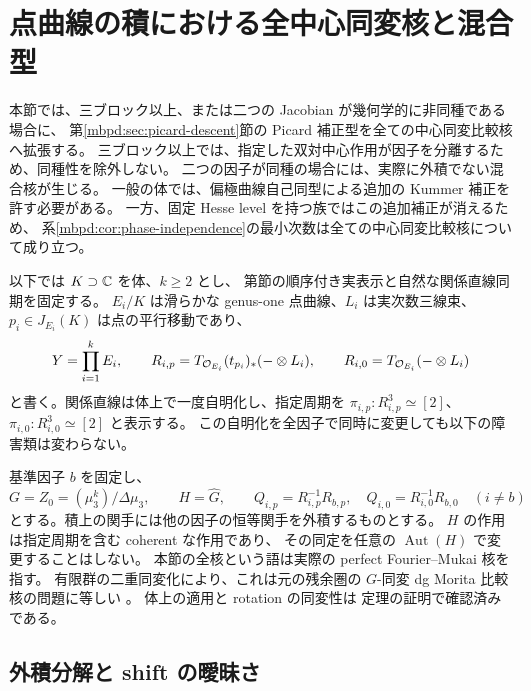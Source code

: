 \section{点曲線の積における全中心同変核と混合型}
\label{mbfc:sec:full-comparison}

本節では、三ブロック以上、または二つの Jacobian が幾何学的に非同種である場合に、
第\ref{mbpd:sec:picard-descent}節の Picard 補正型を全ての中心同変比較核へ拡張する。
三ブロック以上では、指定した双対中心作用が因子を分離するため、同種性を除外しない。
二つの因子が同種の場合には、実際に外積でない混合核が生じる。
一般の体では、偏極曲線自己同型による追加の Kummer 補正を許す必要がある。
一方、固定 Hesse level を持つ族ではこの追加補正が消えるため、
系\ref{mbpd:cor:phase-independence}の最小次数は全ての中心同変比較核について成り立つ。

以下では $K\supset\mathbb C$ を体、$k\ge2$ とし、
第節の順序付き実表示と自然な関係直線同期を固定する。
$E_i/K$ は滑らかな genus-one 点曲線、$L_i$ は実次数三線束、
$p_i\in J_{E_i}(K)$ は点の平行移動であり、
\[
 Y=\prod_{i=1}^k E_i,\qquad
 R_{i,p}=T_{\mathcal O_{E_i}}(t_{p_i})_*(-\otimes L_i),\qquad
 R_{i,0}=T_{\mathcal O_{E_i}}(-\otimes L_i)
\]
と書く。関係直線は体上で一度自明化し、指定周期を
$\pi_{i,p}:R_{i,p}^3\simeq[2]$、
$\pi_{i,0}:R_{i,0}^3\simeq[2]$ と表示する。
この自明化を全因子で同時に変更しても以下の障害類は変わらない。

基準因子 $b$ を固定し、
\[
 G=Z_0=(\mu_3^k)/\Delta\mu_3,\qquad H=\widehat G,
 \qquad Q_{i,p}=R_{i,p}^{-1}R_{b,p},\quad
 Q_{i,0}=R_{i,0}^{-1}R_{b,0}\quad(i\ne b)
\]
とする。積上の関手には他の因子の恒等関手を外積するものとする。
$H$ の作用は指定周期を含む coherent な作用であり、
その同定を任意の $\operatorname{Aut}(H)$ で変更することはしない。
本節の全核という語は実際の perfect Fourier--Mukai 核を指す。
有限群の二重同変化により、これは元の残余圏の
$G$-同変 dg Morita 比較核の問題に等しい
\cite[Proposition~4.1, Theorem~4.2]{MEDElagin}。
体上の適用と rotation の同変性は
定理の証明で確認済みである。

\subsection{外積分解と shift の曖昧さ}

